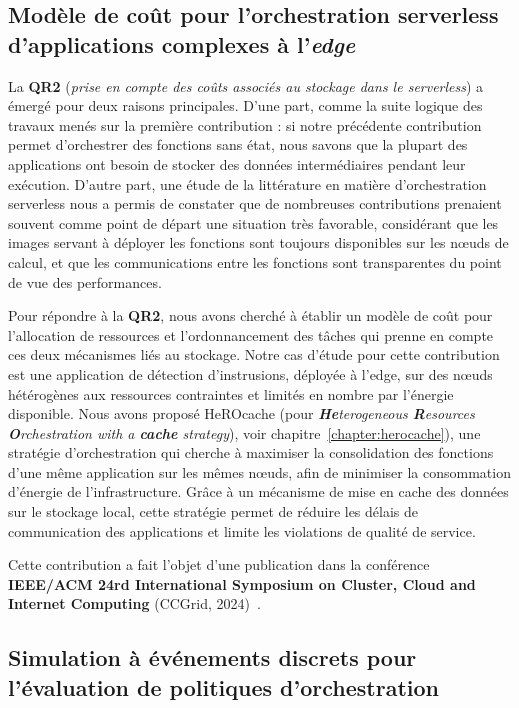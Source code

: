 \subsection{Modèle de coût pour l'orchestration serverless d'applications complexes à l'\textit{edge}}

La \textbf{QR2} (\textit{prise en compte des coûts associés au stockage dans le serverless}) a émergé pour deux raisons principales. D'une part, comme la suite logique des travaux menés sur la première contribution : si notre précédente contribution permet d'orchestrer des fonctions sans état, nous savons que la plupart des applications ont besoin de stocker des données intermédiaires pendant leur exécution. D'autre part, une étude de la littérature en matière d'orchestration serverless nous a permis de constater que de nombreuses contributions prenaient souvent comme point de départ une situation très favorable, considérant que les images servant à déployer les fonctions sont toujours disponibles sur les nœuds de calcul, et que les communications entre les fonctions sont transparentes du point de vue des performances.

Pour répondre à la \textbf{QR2}, nous avons cherché à établir un modèle de coût pour l'allocation de ressources et l'ordonnancement des tâches qui prenne en compte ces deux mécanismes liés au stockage. Notre cas d'étude pour cette contribution est une application de détection d'instrusions, déployée à l'edge, sur des nœuds hétérogènes aux ressources contraintes et limités en nombre par l'énergie disponible. Nous avons proposé HeROcache (pour \textit{\textbf{He}terogeneous \textbf{R}esources \textbf{O}rchestration with a \textbf{cache} strategy}), voir chapitre~\ref{chapter:herocache}), une stratégie d'orchestration qui cherche à maximiser la consolidation des fonctions d'une même application sur les mêmes nœuds, afin de minimiser la consommation d'énergie de l'infrastructure. Grâce à un mécanisme de mise en cache des données sur le stockage local, cette stratégie permet de réduire les délais de communication des applications et limite les violations de qualité de service.

Cette contribution a fait l'objet d'une publication dans la conférence \textbf{IEEE/ACM 24rd International Symposium on Cluster, Cloud and Internet Computing} (CCGrid, 2024)~\cite{herocache}.

\subsection{Simulation à événements discrets pour l'évaluation de politiques d'orchestration}


